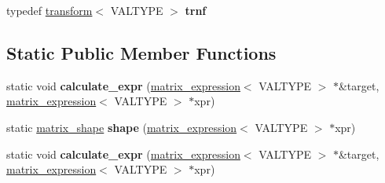 \begin{DoxyCompactItemize}
\item 
\hypertarget{class__lace__expressions_1_1__summa__specific_3_01VALTYPE_00_01matrix__expression_3_01VALTYPE_01_4_01_4_ae4032ee28b6df73b5b39c1dc87340604}{typedef \hyperlink{class__lace__expressions_1_1transform}{transform}$<$ V\-A\-L\-T\-Y\-P\-E $>$ {\bfseries trnf}}\label{class__lace__expressions_1_1__summa__specific_3_01VALTYPE_00_01matrix__expression_3_01VALTYPE_01_4_01_4_ae4032ee28b6df73b5b39c1dc87340604}

\end{DoxyCompactItemize}
\subsection*{Static Public Member Functions}
\begin{DoxyCompactItemize}
\item 
\hypertarget{class__lace__expressions_1_1__summa__specific_3_01VALTYPE_00_01matrix__expression_3_01VALTYPE_01_4_01_4_a01389dcbd20d86981a4b94e48a0f5bea}{static void {\bfseries calculate\-\_\-expr} (\hyperlink{class__lace__expressions_1_1matrix__expression}{matrix\-\_\-expression}$<$ V\-A\-L\-T\-Y\-P\-E $>$ $\ast$\&target, \hyperlink{class__lace__expressions_1_1matrix__expression}{matrix\-\_\-expression}$<$ V\-A\-L\-T\-Y\-P\-E $>$ $\ast$xpr)}\label{class__lace__expressions_1_1__summa__specific_3_01VALTYPE_00_01matrix__expression_3_01VALTYPE_01_4_01_4_a01389dcbd20d86981a4b94e48a0f5bea}

\item 
\hypertarget{class__lace__expressions_1_1__summa__specific_3_01VALTYPE_00_01matrix__expression_3_01VALTYPE_01_4_01_4_a0d049beb3d828e2daf4c8aad3983f073}{static \hyperlink{struct__lace__storage_1_1matrix__shape}{matrix\-\_\-shape} {\bfseries shape} (\hyperlink{class__lace__expressions_1_1matrix__expression}{matrix\-\_\-expression}$<$ V\-A\-L\-T\-Y\-P\-E $>$ $\ast$xpr)}\label{class__lace__expressions_1_1__summa__specific_3_01VALTYPE_00_01matrix__expression_3_01VALTYPE_01_4_01_4_a0d049beb3d828e2daf4c8aad3983f073}

\item 
\hypertarget{class__lace__expressions_1_1__summa__specific_3_01VALTYPE_00_01matrix__expression_3_01VALTYPE_01_4_01_4_a01389dcbd20d86981a4b94e48a0f5bea}{static void {\bfseries calculate\-\_\-expr} (\hyperlink{class__lace__expressions_1_1matrix__expression}{matrix\-\_\-expression}$<$ V\-A\-L\-T\-Y\-P\-E $>$ $\ast$\&target, \hyperlink{class__lace__expressions_1_1matrix__expression}{matrix\-\_\-expression}$<$ V\-A\-L\-T\-Y\-P\-E $>$ $\ast$xpr)}\label{class__lace__expressions_1_1__summa__specific_3_01VALTYPE_00_01matrix__expression_3_01VALTYPE_01_4_01_4_a01389dcbd20d86981a4b94e48a0f5bea}


\end{DoxyCompactItemize}
